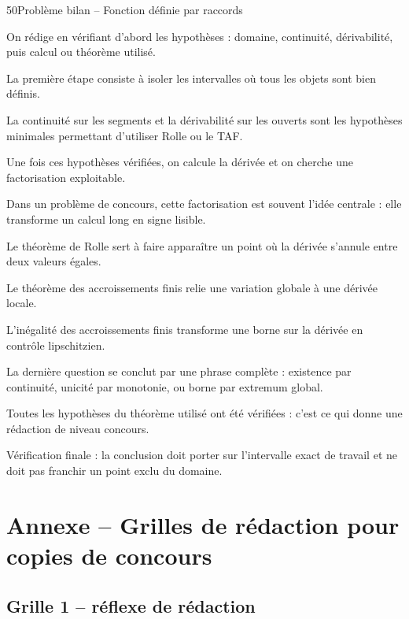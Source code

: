 \documentclass[11pt,a4paper]{article}
\begin{document}
\begin{corrbox}{50}{Problème bilan -- Fonction définie par raccords}

\begin{methodebox}
On rédige en vérifiant d'abord les hypothèses : domaine, continuité, dérivabilité, puis calcul ou théorème utilisé.
\end{methodebox}

La première étape consiste à isoler les intervalles où tous les objets sont bien définis.


La continuité sur les segments et la dérivabilité sur les ouverts sont les hypothèses minimales permettant d'utiliser Rolle ou le TAF.


Une fois ces hypothèses vérifiées, on calcule la dérivée et on cherche une factorisation exploitable.


Dans un problème de concours, cette factorisation est souvent l'idée centrale : elle transforme un calcul long en signe lisible.


Le théorème de Rolle sert à faire apparaître un point où la dérivée s'annule entre deux valeurs égales.


Le théorème des accroissements finis relie une variation globale à une dérivée locale.


L'inégalité des accroissements finis transforme une borne sur la dérivée en contrôle lipschitzien.


La dernière question se conclut par une phrase complète : existence par continuité, unicité par monotonie, ou borne par extremum global.


Toutes les hypothèses du théorème utilisé ont été vérifiées : c'est ce qui donne une rédaction de niveau concours.


\begin{attentionbox}
Vérification finale : la conclusion doit porter sur l'intervalle exact de travail et ne doit pas franchir un point exclu du domaine.
\end{attentionbox}

\end{corrbox}


\newpage
\section{Annexe -- Grilles de rédaction pour copies de concours}
\subsection*{Grille 1 -- réflexe de rédaction}
\end{document}
